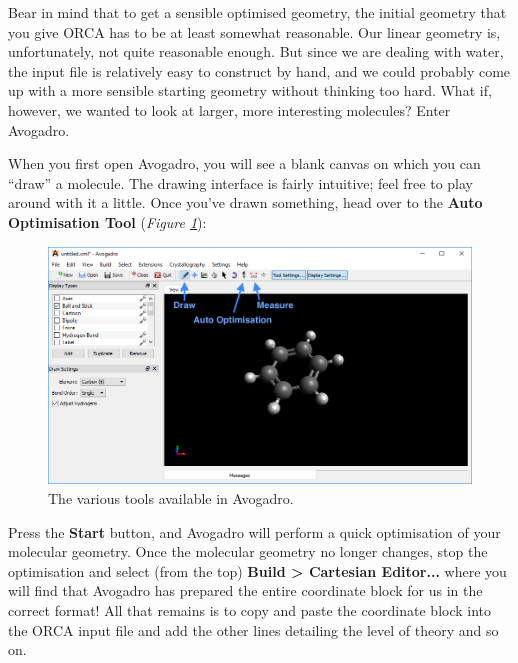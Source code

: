 \documentclass[10pt]{article}
\newcommand{\figref}[1]{\textit{Figure \ref{fig:#1}}}
\begin{document}
Bear in mind that to get a sensible optimised geometry, the initial geometry that you give ORCA has to be at least somewhat reasonable. Our linear geometry is, unfortunately, not quite reasonable enough. But since we are dealing with water, the input file is relatively easy to construct by hand, and we could probably come up with a more sensible starting geometry without thinking too hard. What if, however, we wanted to look at larger, more interesting molecules? Enter Avogadro. 

When you first open Avogadro, you will see a blank canvas on which you can ``draw'' a molecule. The drawing interface is fairly intuitive; feel free to play around with it a little. Once you've drawn something, head over to the \textbf{Auto Optimisation Tool} (\figref{avoopt}):

\begin{figure}[H]
    \centering
    \includegraphics[scale=0.45]{./img/avoopt}
    \caption{The various tools available in Avogadro.}
    \label{fig:avoopt}
\end{figure} 

Press the \textbf{Start} button, and Avogadro will perform a quick optimisation of your molecular geometry. Once the molecular geometry no longer changes, stop the optimisation and select (from the top) \textbf{Build > Cartesian Editor...} where you will find that Avogadro has prepared the entire coordinate block for us in the correct format! All that remains is to copy and paste the coordinate block into the ORCA input file and add the other lines detailing the level of theory and so on.
\end{document}

